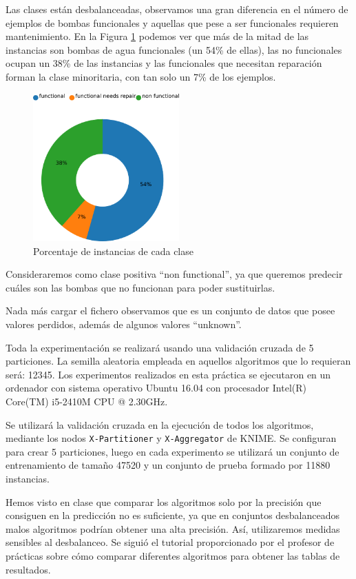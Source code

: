 \documentclass[a4paper, 20pt]{article}
\begin{document}
Las clases están desbalanceadas, observamos una gran diferencia en el número de ejemplos de bombas funcionales y aquellas que pese a ser funcionales requieren mantenimiento. En la Figura \ref{fig:clases2} podemos ver que más de la mitad de las instancias son bombas de agua funcionales (un 54\% de ellas), las no funcionales ocupan un 38\% de las instancias y las funcionales que necesitan reparación forman la clase minoritaria, con tan solo un 7\% de los ejemplos.

\begin{figure}[H]
    \centering
    \includegraphics[width=0.5\textwidth]{chart2}
    \caption{Porcentaje de instancias de cada clase}
    \label{fig:clases2}
\end{figure}

Consideraremos como clase positiva ``non functional'', ya que queremos predecir cuáles son las bombas que no funcionan para poder sustituirlas.

Nada más cargar el fichero observamos que es un conjunto de datos que posee valores perdidos, además de algunos valores ``unknown''. 

Toda la experimentación se realizará usando una validación cruzada de 5 particiones. La semilla aleatoria empleada en aquellos algoritmos que lo requieran será: 12345.
Los experimentos realizados en esta práctica se ejecutaron en un ordenador con sistema operativo Ubuntu 16.04 con procesador Intel(R) Core(TM) i5-2410M CPU @ 2.30GHz.

Se utilizará la validación cruzada en la ejecución de todos los algoritmos, mediante los nodos \texttt{X-Partitioner} y \texttt{X-Aggregator} de KNIME. Se configuran para crear 5 particiones, luego en cada experimento se utilizará un conjunto de entrenamiento de tamaño 47520 y un conjunto de prueba formado por 11880 instancias.

Hemos visto en clase que comparar los algoritmos solo por la precisión que consiguen en la predicción no es suficiente, ya que en conjuntos desbalanceados malos algoritmos podrían obtener una alta precisión. Así, utilizaremos medidas sensibles al desbalanceo. Se siguió el tutorial proporcionado por el profesor de prácticas sobre cómo comparar diferentes algoritmos para obtener las tablas de resultados.
\end{document}
